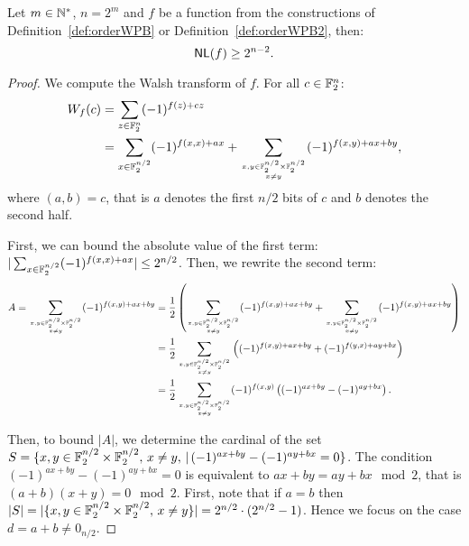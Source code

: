\documentclass[11pt]{llncs}
\begin{document}
\begin{theorem}\label{th:NLbound}
Let $m\in \mathbb{N}^*$, $n=2^m$ and $f$ be a function from the constructions of Definition~\ref{def:orderWPB} or Definition~\ref{def:orderWPB2}, then:
\[\mathsf{NL}(f)\ge 2^{n-2}.\]
\end{theorem}

\begin{proof}
We compute the Walsh transform of $f$. For all $c\in \mathbb{F}_2^n$:
\begin{align*}
W_{f}(c)&=\sum_{z\in \mathbb{F}_2^n} (-1)^{f(z)+c z}\\
&=\sum_{x \in \mathbb{F}_2^{n/2}} (-1)^{f(x,x)+a x} + \sum_{x,y \in \mathbb{F}_2^{n/2} \times \mathbb{F}_2^{n/2} \atop {x \ne y}} (-1)^{f(x,y)+a x+ by},
\end{align*}
where $(a,b)=c$, that is $a$ denotes the first $n/2$ bits of $c$ and $b$ denotes the second half.

First, we can bound the absolute value of the first term: $|\sum_{x \in \mathbb{F}_2^{n/2}} (-1)^{f(x,x)+a x}|\le 2^{n/2}$. 
Then, we rewrite the second term:
\begin{align*}
A=\sum_{x,y \in \mathbb{F}_2^{n/2} \times \mathbb{F}_2^{n/2} \atop {x \ne y}} (-1)^{f(x,y)+a x+ by}&=   \frac{1}{2} \left( \sum_{x,y \in \mathbb{F}_2^{n/2} \times \mathbb{F}_2^{n/2} \atop {x \ne y}} (-1)^{f(x,y)+a x+ by}+ \sum_{x,y \in \mathbb{F}_2^{n/2} \times \mathbb{F}_2^{n/2} \atop {x \ne y}} (-1)^{f(x,y)+a x+ by}\right)\\
&= \frac{1}{2} \sum_{x,y \in \mathbb{F}_2^{n/2} \times \mathbb{F}_2^{n/2} \atop {x \ne y}} \left((-1)^{f(x,y)+a x+ by} + (-1)^{f(y,x)+a y+ bx} \right)\\
&= \frac{1}{2} \sum_{x,y \in \mathbb{F}_2^{n/2} \times \mathbb{F}_2^{n/2} \atop {x \ne y}} (-1)^{f(x,y)} \left( (-1)^{a x+ by} - (-1)^{a y+ bx} \right).
\end{align*}

Then, to bound $|A|$, we determine the cardinal of the set $S=\{x,y\in \mathbb{F}_2^{n/2} \times \mathbb{F}_2^{n/2}, \, x \ne y, \, | \, (-1)^{ax+by}- (-1)^{ay+bx}=0\}$. The condition $(-1)^{ax+by}- (-1)^{ay+bx}=0$ is equivalent to $ax+by=ay+bx \mod 2$, that is $(a+b)(x+y)=0 \mod 2$. 
First, note that if $a=b$ then $|S|=|\{x,y\in \mathbb{F}_2^{n/2} \times \mathbb{F}_2^{n/2}, \, x \ne y\}|=
2^{n/2} \cdot (2^{n/2}-1)$. Hence we focus on the case $d=a+b\ne 0_{n/2}$. 


\end{proof}
\end{document}
